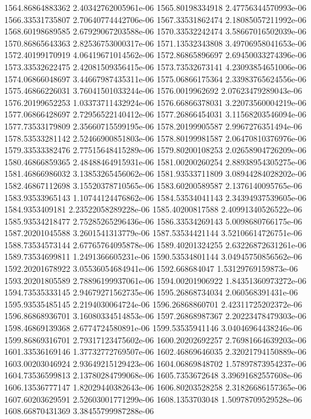 {1564.86864883362 2.40342762005961e-06
1565.80198334918 2.47756344570993e-06
1566.33531735807 2.70640774442706e-06
1567.33531862474 2.18085057211992e-06
1568.60198689585 2.67929067203588e-06
1570.33532242474 3.58667016502039e-06
1570.86865643363 2.82536753000317e-06
1571.13532343808 3.49706958041653e-06
1572.40199170919 4.06419671014562e-06
1572.86865896697 2.69450033274396e-06
1573.33532622475 2.42081509356415e-06
1573.73532673141 4.23093854651006e-06
1574.06866048697 3.44667987435311e-06
1575.06866175364 2.33983765624556e-06
1575.46866226031 3.76041501033244e-06
1576.0019962692 2.07623479289043e-06
1576.20199652253 1.03373711432924e-06
1576.66866378031 3.22073560004219e-06
1577.06866428697 2.72956522140412e-06
1577.26866454031 3.11568203546094e-06
1577.73533179809 2.35660715599195e-06
1578.20199905587 2.9967276351494e-06
1578.53533281142 2.52466900851803e-06
1578.80199981587 2.06470810376976e-06
1579.33533382476 2.77515648415289e-06
1579.80200108253 2.02658904726209e-06
1580.46866859365 2.48488464915931e-06
1581.00200260254 2.88938954305275e-06
1581.46866986032 3.13853265456062e-06
1581.93533711809 3.08944284028202e-06
1582.46867112698 3.15520378710565e-06
1583.60200589587 2.1376140095765e-06
1583.93533965143 1.10744124476862e-06
1584.53534041143 2.34394937539605e-06
1584.9353409181 2.23522058289228e-06
1585.40200817588 2.40991340526522e-06
1585.93534218477 2.75285265296436e-06
1586.33534269143 5.0098680766175e-06
1587.20201045588 3.2601541313779e-06
1587.53534421144 3.52106614726751e-06
1588.73534573144 2.67765764095878e-06
1589.40201324255 2.63226872631261e-06
1589.73534699811 1.2491366605231e-06
1590.53534801144 3.04945750856562e-06
1592.20201678922 3.05536054684941e-06
1592.668684047 1.53129769159873e-06
1593.20201805589 2.78896199937061e-06
1594.00201906922 1.84351360973272e-06
1594.73535333145 2.94679271562735e-06
1595.26868734034 2.060568391431e-06
1595.93535485145 2.2194030064724e-06
1596.26868860701 2.42311725202372e-06
1596.86868936701 3.16080334514853e-06
1597.26868987367 2.20223478479303e-06
1598.46869139368 2.6774724580891e-06
1599.53535941146 3.04046964438246e-06
1599.86869316701 2.79317123475602e-06
1600.20202692257 2.76981664639203e-06
1601.33536169146 1.37732772769507e-06
1602.46869646035 2.32021794150889e-06
1603.00203046924 2.93649215129423e-06
1604.06869848702 1.57897873954237e-06
1604.73536599813 2.13780284799068e-06
1605.7353672648 3.39691682557608e-06
1606.13536777147 1.82029440382643e-06
1606.80203528258 2.31826686157365e-06
1607.60203629591 2.52603001771299e-06
1608.1353703048 1.50978709529528e-06
1608.66870431369 3.38455799987288e-06
}
